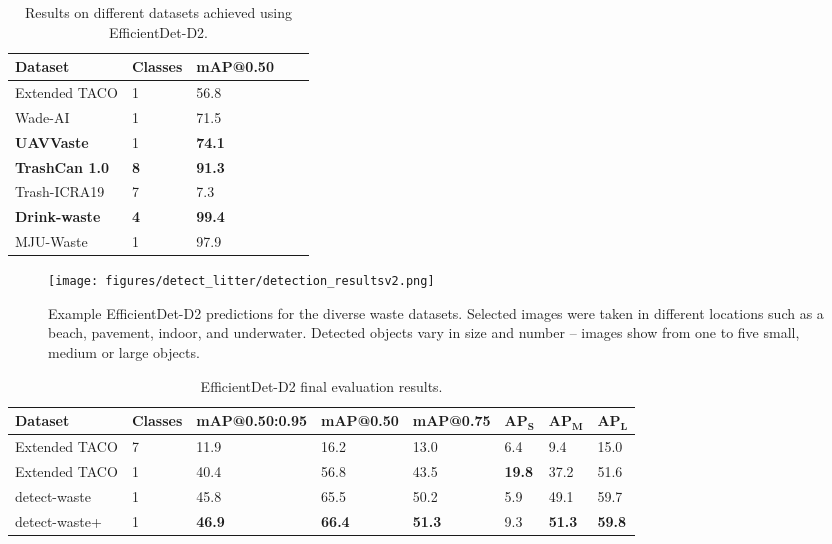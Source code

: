 \documentclass{article}
\begin{document}
{
\begin{table}[!hbt]
\centering
\caption{Results on different datasets achieved using EfficientDet-D2.}
\label{tab:datacomp}
\begin{tabular}{lllll}
\hline
\textbf{Dataset}       & \textbf{Classes} & \textbf{mAP@0.50} \\ \hline
Extended TACO          & 1                & 56.8  \\
Wade-AI                & 1                & 71.5  \\
\textbf{UAVVaste}      & 1                & \textbf{74.1}  \\ \hline
\textbf{TrashCan 1.0}  & \textbf{8}       & \textbf{91.3}  \\
Trash-ICRA19           & 7                & 7.3  \\ \hline
\textbf{Drink-waste}   & \textbf{4}       & \textbf{99.4}  \\
MJU-Waste              & 1                & 97.9  \\
\hline
\end{tabular}
\end{table}
}

\begin{figure}[!hbt]
\centering
  \texttt{[image: figures/detect\_litter/detection\_resultsv2.png]}\caption{Example EfficientDet-D2 predictions for the diverse waste datasets. Selected images were taken in different locations such as a beach, pavement, indoor, and underwater. Detected objects vary in size and number -- images show from one to five small, medium or large objects.\label{fig.detection_results}}
\end{figure}

{
\begin{table}[!hbt]
\centering
\caption{EfficientDet-D2 final evaluation results.}
\label{tab:finalresults}
\begin{tabular}{llllllll}
\hline
\textbf{Dataset}       & \textbf{Classes} & \textbf{mAP@0.50:0.95} & \textbf{mAP@0.50} & \textbf{mAP@0.75} & $\mathbf{AP_{S}}$ & $\mathbf{AP_{M}}$ & $\mathbf{AP_{L}}$\\ \hline
Extended TACO      & 7       & 11.9          & 16.2           & 13.0          & 6.4           & 9.4            & 15.0 \\
Extended TACO      & 1       & 40.4          & 56.8           & 43.5          & \textbf{19.8} & 37.2           & 51.6  \\
detect-waste       & 1       & 45.8          & 65.5           & 50.2          & 5.9           & 49.1           & 59.7  \\
detect-waste+      & 1       & \textbf{46.9} & \textbf{66.4}  & \textbf{51.3} & 9.3           & \textbf{51.3}  & \textbf{59.8}  \\
\hline
\end{tabular}
\end{table}
}
\end{document}
